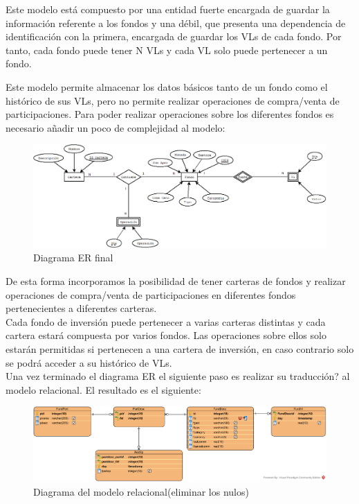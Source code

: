 \documentclass[12pt, a4paper]{article}
\begin{document}
Este modelo está compuesto por una entidad fuerte encargada de guardar la información referente a los fondos y una débil, que presenta una dependencia de identificación con la primera, encargada de guardar los \gls{VL}s de cada fondo. Por tanto, cada fondo puede tener N \gls{VL}s y cada \gls{VL} solo puede pertenecer a un fondo.

\newpage

Este modelo permite almacenar los datos básicos tanto de un fondo como el histórico de sus \gls{VL}s, pero no permite realizar operaciones de compra/venta de participaciones. Para poder realizar operaciones sobre los diferentes fondos es necesario añadir un poco de complejidad al modelo:

\begin{figure}[htbp]
	\centering
	\includegraphics[width=\textwidth]{figuras/ERCompleto.png}
	\caption{Diagrama ER final}
	\label{fig:erfinal}
	\end {figure}



De esta forma incorporamos la posibilidad de tener carteras de fondos y realizar operaciones de compra/venta de participaciones en diferentes fondos pertenecientes a diferentes carteras.\\

Cada fondo de inversión puede pertenecer a varias carteras distintas y cada cartera estará compuesta por varios fondos. Las operaciones sobre ellos solo estarán permitidas si pertenecen a una cartera de inversión, en caso contrario solo se podrá acceder a su histórico de \gls{VL}s.\\

Una vez terminado el diagrama \gls{ER} el siguiente paso es realizar su traducción? al modelo relacional. El resultado es el siguiente:\\

\begin{figure}[htbp]
	\centering
	\includegraphics[width=\textwidth]{figuras/DiagramaR.png}
	\caption{Diagrama del modelo relacional(eliminar los nulos)}
	\label{fig:relacional}
	\end {figure}
	
\end{document}
